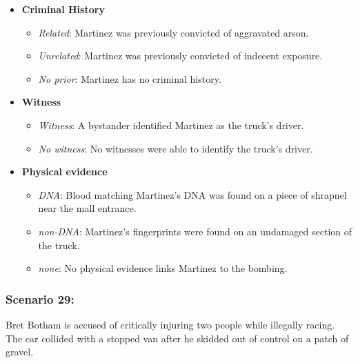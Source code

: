 \documentclass[
]{article}
\providecommand{\tightlist}{%
  \setlength{\itemsep}{0pt}\setlength{\parskip}{0pt}}
\begin{document}
\begin{itemize}
\tightlist
\item
  \textbf{Criminal History}

  \begin{itemize}
  \tightlist
  \item
    \emph{Related}: Martinez was previously convicted of aggravated
    arson.
  \item
    \emph{Unrelated}: Martinez was previously convicted of indecent
    exposure.
  \item
    \emph{No prior}: Martinez has no criminal history.
  \end{itemize}
\item
  \textbf{Witness}

  \begin{itemize}
  \tightlist
  \item
    \emph{Witness}: A bystander identified Martinez as the truck's
    driver.
  \item
    \emph{No witness}: No witnesses were able to identify the truck's
    driver.
  \end{itemize}
\item
  \textbf{Physical evidence}

  \begin{itemize}
  \tightlist
  \item
    \emph{DNA}: Blood matching Martinez's DNA was found on a piece of
    shrapnel near the mall entrance.
  \item
    \emph{non-DNA}: Martinez's fingerprints were found on an undamaged
    section of the truck.
  \item
    \emph{none}: No physical evidence links Martinez to the bombing.
  \end{itemize}
\end{itemize}

\hypertarget{scenario-29}{%
\subsubsection{Scenario 29:}\label{scenario-29}}

Bret Botham is accused of critically injuring two people while illegally
racing. The car collided with a stopped van after he skidded out of
control on a patch of gravel.
\end{document}
